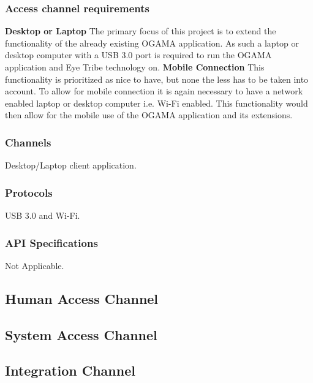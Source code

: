 \subsubsection{Access channel requirements}
\textbf{Desktop or Laptop}
\newline
The primary focus of this project is to extend the functionality of the already existing OGAMA application. As such a laptop or desktop computer with a USB 3.0 port is required to run the OGAMA application and Eye Tribe technology on.
\newline
\textbf{Mobile Connection}
\newline
 This functionality is prioritized as nice to have, but none the less has to be taken into account. To allow for mobile connection it is again necessary to have a network enabled laptop or desktop computer i.e. Wi-Fi enabled. This functionality would then allow for the mobile use of the OGAMA application and its extensions.\newline 

\subsubsection{Channels}
Desktop/Laptop client application.
\subsubsection{Protocols}
USB 3.0 and Wi-Fi.
\subsubsection{API Specifications}
Not Applicable.

\subsection{Human Access Channel}
\subsection{System Access Channel}
\subsection{Integration Channel}
